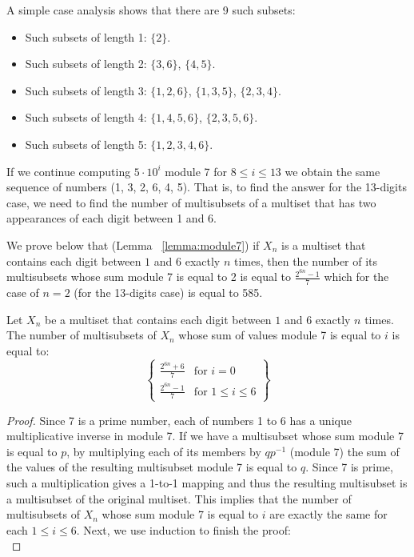 \begin{solution}
A simple case analysis shows that there are 9 such subsets:
\begin{itemize}
	\item Such subsets of length 1: $\{2\}$.
	\item Such subsets of length 2: $\{3,6\}$, $\{4,5\}$.
	\item Such subsets of length 3: $\{1,2,6\}$, $\{1,3,5\}$, $\{2,3,4\}$.
	\item Such subsets of length 4: $\{1,4,5,6\}$, $\{2,3,5,6\}$.
	\item Such subsets of length 5: $\{1,2,3,4,6\}$.
\end{itemize}

If we continue computing $5 \cdot 10^i$ module 7 for $8 \leq i  \leq 13$ we obtain the same sequence of numbers (1, 3, 2, 6, 4, 5). That is, to find the answer for the 13-digits case, we need to find the number of multisubsets of a multiset that has two appearances of each digit between 1 and 6.

We prove below that (Lemma ~\ref{lemma:module7}) if $X_n$ is a multiset that contains each digit between $1$ and $6$ exactly $n$ times, then the number of its multisubsets whose sum module 7 is equal to 2 is equal to $
\frac{2^{6n}-1}{7}
$ which for the case of $n=2$ (for the 13-digits case) is equal to 585.

\begin{lemma}\label{lemma:module7}
Let $X_n$ be a multiset that contains each digit between $1$ and $6$ exactly $n$ times. The number of  multisubsets of $X_n$ whose sum of values module 7 is equal to $i$ is equal to:
$$
\left\{ \begin{array}{lr}
\frac{2^{6n}+6}{7} & \text{for } i=0\\
\frac{2^{6n}-1}{7} & \text{for } 1\leq i\leq 6
\end{array} \right\}
$$
\end{lemma}
\begin{proof}
Since 7 is a prime number, each of numbers 1 to 6 has a unique multiplicative inverse in module  7. If we have a multisubset whose sum module 7 is equal to  $p$, by multiplying each of its members by $qp^{-1}$ (module 7) the sum of the values of the resulting multisubset module 7 is equal to $q$. Since 7 is prime, such a multiplication gives a 1-to-1 mapping and thus the resulting multisubset is a multisubset of the original multiset. This implies that the number of multisubsets of $X_n$ whose sum module 7 is equal to $i$ are exactly the same for each $1 \leq i \leq 6$. Next, we use induction to finish the proof:\\[0.2cm]


\end{proof}
\end{solution}
